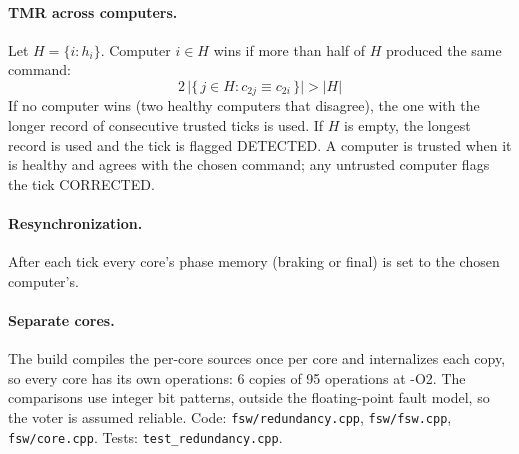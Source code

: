 \documentclass[11pt]{article}
\begin{document}
\paragraph{TMR across computers.} Let $H = \{i : h_i\}$. Computer $i \in H$ wins if more
than half of $H$ produced the same command:
\begin{equation}
2\,\bigl|\{\,j \in H : c_{2j} \equiv c_{2i}\,\}\bigr| > |H|
\end{equation}
If no computer wins (two healthy computers that disagree), the one with the longer record
of consecutive trusted ticks is used. If $H$ is empty, the longest record is used and the
tick is flagged DETECTED. A computer is trusted when it is healthy and agrees with the
chosen command; any untrusted computer flags the tick CORRECTED.

\paragraph{Resynchronization.} After each tick every core's phase memory (braking or final)
is set to the chosen computer's.

\paragraph{Separate cores.} The build compiles the per-core sources once per core and
internalizes each copy, so every core has its own operations: 6 copies of 95 operations at -O2.
The comparisons use integer bit patterns, outside the floating-point fault model, so the
voter is assumed reliable.
Code: \texttt{fsw/redundancy.cpp}, \texttt{fsw/fsw.cpp}, \texttt{fsw/core.cpp}.
Tests: \texttt{test\_redundancy.cpp}.
\end{document}
